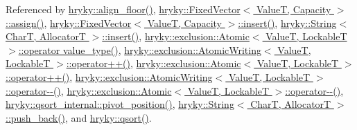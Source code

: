 Referenced by \hyperlink{namespacehryky_a84803d86a3bb217481dd0a180734fb8f}{hryky\-::align\-\_\-floor()}, \hyperlink{classhryky_1_1_fixed_vector_a1bf7588b15fe89dc8f04d843c4722e02}{hryky\-::\-Fixed\-Vector$<$ Value\-T, Capacity $>$\-::assign()}, \hyperlink{classhryky_1_1_fixed_vector_a8fb930253e5023e26863dbb41be7a955}{hryky\-::\-Fixed\-Vector$<$ Value\-T, Capacity $>$\-::insert()}, \hyperlink{classhryky_1_1_string_a62f0f7325194c1c86dfbd6af80605b90}{hryky\-::\-String$<$ Char\-T, Allocator\-T $>$\-::insert()}, \hyperlink{classhryky_1_1exclusion_1_1_atomic_a86b7e74f617451e268f58ca8e153c672}{hryky\-::exclusion\-::\-Atomic$<$ Value\-T, Lockable\-T $>$\-::operator value\-\_\-type()}, \hyperlink{group__exclusion__control_ga6c7259992061b671eb6659fb2ce28f9c}{hryky\-::exclusion\-::\-Atomic\-Writing$<$ Value\-T, Lockable\-T $>$\-::operator++()}, \hyperlink{classhryky_1_1exclusion_1_1_atomic_a5c6f6492d00d72e7a521197b81ffe4f4}{hryky\-::exclusion\-::\-Atomic$<$ Value\-T, Lockable\-T $>$\-::operator++()}, \hyperlink{group__exclusion__control_ga39cdbea957f1abd0251446989d3f82ec}{hryky\-::exclusion\-::\-Atomic\-Writing$<$ Value\-T, Lockable\-T $>$\-::operator-\/-\/()}, \hyperlink{classhryky_1_1exclusion_1_1_atomic_aa621bcf7758e9731800e6a5e9fcc99fe}{hryky\-::exclusion\-::\-Atomic$<$ Value\-T, Lockable\-T $>$\-::operator-\/-\/()}, \hyperlink{namespacehryky_1_1qsort__internal_a2a9908c1e249d16e6701c06e341f9e1d}{hryky\-::qsort\-\_\-internal\-::pivot\-\_\-position()}, \hyperlink{classhryky_1_1_string_a0e5eea4617e8a71510a1e34958b0d189}{hryky\-::\-String$<$ Char\-T, Allocator\-T $>$\-::push\-\_\-back()}, and \hyperlink{namespacehryky_a438e3ee8f5109856c4a1e4daa9980982}{hryky\-::qsort()}.

